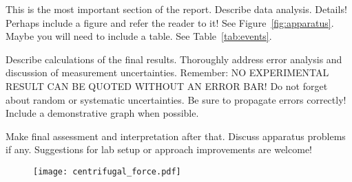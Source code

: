 \documentclass[12pt,letterpaper,onecolumn]{article}
\begin{document}
This is the most important section of the report.
Describe data analysis. Details! Perhaps include a figure and refer
the reader to it! See Figure~\ref{fig:apparatus}. Maybe you will need
to include a table. See Table~\ref{tab:events}.

Describe calculations of the final results.
Thoroughly address error analysis and discussion of measurement
uncertainties. Remember: NO EXPERIMENTAL RESULT CAN BE QUOTED
WITHOUT AN ERROR BAR! Do not forget about random or systematic
uncertainties. Be sure to propagate errors correctly!
Include a demonstrative graph when possible.


Make final assessment and interpretation after that.
Discuss apparatus problems if any. Suggestions for
lab setup or approach improvements are welcome!


\begin{figure}[h]
 \begin{center}
 \texttt{[image: centrifugal\_force.pdf]}
 \end{center}
\end{figure}


%
%
\end{document}
